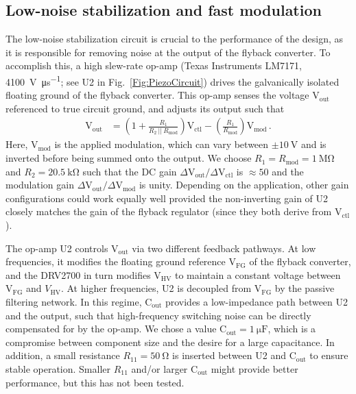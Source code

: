 \documentclass[aip,rsi,reprint]{revtex4-1} %
\begin{document}
\subsection{Low-noise stabilization and fast modulation}
\label{Sec:LowNoiseStabilization}

The low-noise stabilization circuit is crucial to the performance of the design, as it is responsible for removing noise at the output of the flyback converter.
To accomplish this, a high slew-rate op-amp (Texas Instruments LM7171, \SI[per-mode=symbol]{4100}{\volt\per\micro\second}; see U2 in Fig.~\ref{Fig:PiezoCircuit}) drives the galvanically isolated floating ground of the flyback converter.
This op-amp senses the voltage $\text{V}_\text{out}$ referenced to true circuit ground, and adjusts its output such that
\begin{align}
\text{V}_\text{out} &= \left(1 + \frac{R_1}{R_2~||~R_\text{mod}}\right) \text{V}_\text{ctl} -
\left(\frac{R_1}{R_\text{mod}}\right) \text{V}_\text{mod}\,.
\label{Eq:FullTransferFunc}
\end{align}
Here, $\text{V}_\text{mod}$ is the applied modulation, which can vary between $\pm\SI{10}{\volt}$ and is inverted before being summed onto the output.
We choose $R_1 = R_\text{mod} = \SI{1}{\mega\ohm}$ and $R_2 = \SI{20.5}{\kilo\ohm}$ such that the DC gain $\Delta\text{V}_\text{out}/\Delta\text{V}_\text{ctl}$ is $\approx 50$ and the modulation gain $\Delta\text{V}_\text{out}/\Delta\text{V}_\text{mod}$ is unity.
Depending on the application, other gain configurations could work equally well provided the non-inverting gain of U2 closely matches the gain of the flyback regulator (since they both derive from $\text{V}_\text{ctl}$).

The op-amp U2 controls $\text{V}_\text{out}$ via two different feedback pathways.
At low frequencies, it modifies the floating ground reference $\text{V}_\text{FG}$ of the flyback converter, and the DRV2700 in turn modifies $\text{V}_\text{HV}$ to maintain a constant voltage between $\text{V}_\text{FG}$ and $V_\text{HV}$.
At higher frequencies, U2 is decoupled from $\text{V}_\text{FG}$ by the passive filtering network.
In this regime, $\text{C}_\text{out}$ provides a low-impedance path between U2 and the output, such that high-frequency switching noise can be directly compensated for by the op-amp.
We chose a value $\text{C}_\text{out}=\SI{1}{\micro\farad}$, which is a compromise between component size and the desire for a large capacitance.
In addition, a small resistance $R_{11} = \SI{50}{\ohm}$ is inserted between U2 and $\text{C}_\text{out}$ to ensure stable operation.
Smaller $R_{11}$ and/or larger $\text{C}_\text{out}$ might provide better performance, but this has not been tested.
\end{document}
